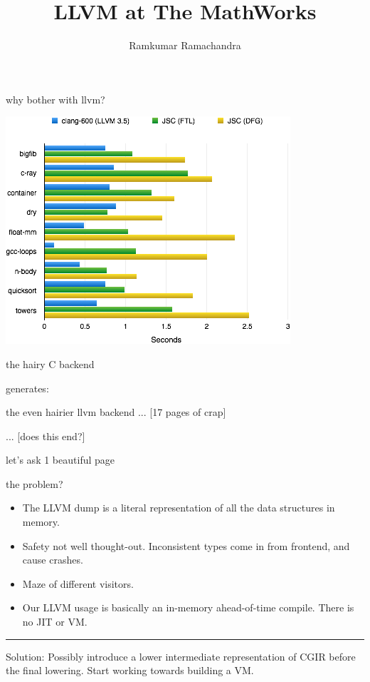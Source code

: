 \documentclass{beamer}
\title{LLVM at The MathWorks}
\author{Ramkumar Ramachandra}
\institute{The MathWorks}
\begin{document}
\begin{frame}
  \titlepage
\end{frame}

\begin{frame}{why bother with llvm?}
  \begin{center}\includegraphics[scale=0.55]{asmjs-ftl-shootout}\end{center}
\end{frame}

\begin{frame}{the hairy C backend}
  
  generates:
  
\end{frame}

\begin{frame}{the even hairier llvm backend}
  ... [17 pages of crap]
  
  ... [does this end?]
\end{frame}

\begin{frame}{let's ask }
  1 beautiful page
  
\end{frame}

\begin{frame}{the problem?}
  \begin{itemize}
  \item The LLVM dump is a literal representation of all the data structures in
    memory.
  \item Safety not well thought-out. Inconsistent types come in from frontend,
    and cause crashes.
  \item Maze of different visitors.
  \item Our LLVM usage is basically an in-memory ahead-of-time compile. There is
    no JIT or VM.
  \end{itemize}
  \noindent\rule{8cm}{0.4pt}
  Solution: Possibly introduce a lower intermediate representation of CGIR
  before the final lowering. Start working towards building a VM.
\end{frame}
\end{document}
